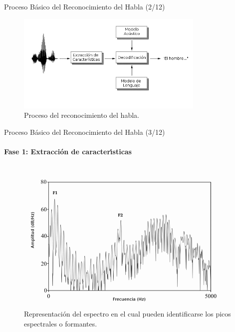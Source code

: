 \begin{frame}{Proceso B\'asico del Reconocimiento del Habla (2/12)}

\begin{figure}[H] 
\centering
\includegraphics[width=0.8\textwidth]{./graphics/proceso.png}
\caption{Proceso del reconocimiento del habla.}
\label{figure:proceso}
\end{figure}
\end{frame}


\begin{frame}{Proceso B\'asico del Reconocimiento del Habla (3/12)}
\framesubtitle{Fase 1: Extracci\'on de caracter{\'\i}sticas}
\begin{figure}[H]
\centering
\includegraphics[width=0.9\linewidth]{./graphics/formantes.png}
\caption{Representaci\'on del espectro en el cual pueden identificarse los picos espectrales o formantes.}
\label{figure:formants}
\end{figure}
\end{frame}

